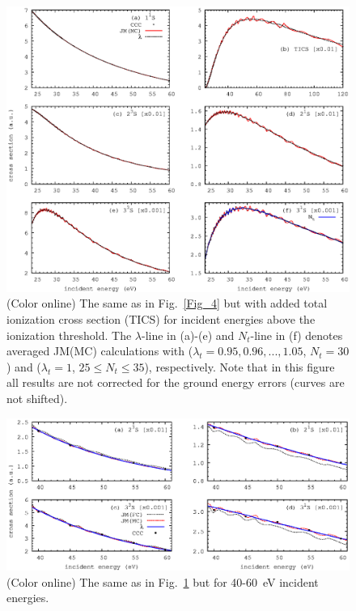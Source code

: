 \documentclass[aip
, pra
, showpacs
, aps
, twocolumn
, groupedaddress
, floatfix
]{revtex4}
\begin{document}
\begin{figure}[htb]
\includegraphics[scale=1]{fig5.ps}
\caption{(Color online)
The same as in Fig.~\ref{Fig_4} but with added total ionization cross section (TICS)
for incident energies above the ionization threshold.
The $\lambda$-line in (a)-(e) and $N_t$-line in (f) denotes averaged JM(MC) calculations with
($\lambda_t=0.95, 0.96, ..., 1.05$, $N_t=30$) and 
($\lambda_t=1$, $25\leq N_t \le 35$), respectively.
Note that in this figure all results are not corrected for the ground energy errors (curves are not shifted).
}
\label{Fig_5}
\end{figure}

\begin{figure}[htb]
\includegraphics[scale=1]{fig6.ps}
\caption{(Color online)
The same as in Fig.~\ref{Fig_5} but for 40-60~eV incident energies.
}
\label{Fig_6}
\end{figure}
\end{document}
